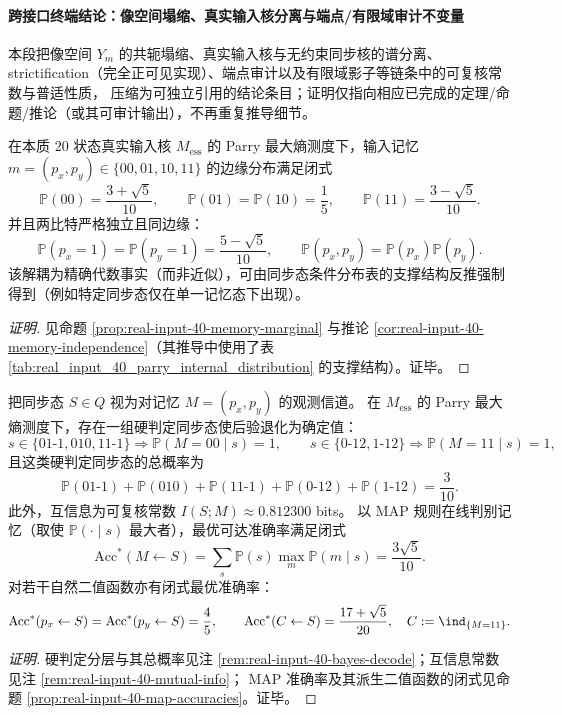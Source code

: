 
\paragraph{跨接口终端结论：像空间塌缩、真实输入核分离与端点/有限域审计不变量}
本段把像空间 \(Y_m\) 的共轭塌缩、真实输入核与无约束同步核的谱分离、strictification（完全正可见实现）、端点审计以及有限域影子等链条中的可复核常数与普适性质，
压缩为可独立引用的结论条目；证明仅指向相应已完成的定理/命题/推论（或其可审计输出），不再重复推导细节。

\begin{conclusion}\label{con:xi-terminal-real-input-parry-memory-decoupling}
在本质 \(20\) 状态真实输入核 \(M_{\mathrm{ess}}\) 的 Parry 最大熵测度下，输入记忆
\(m=(p_x,p_y)\in\{00,01,10,11\}\) 的边缘分布满足闭式
\[
\mathbb{P}(00)=\frac{3+\sqrt5}{10},\qquad
\mathbb{P}(01)=\mathbb{P}(10)=\frac15,\qquad
\mathbb{P}(11)=\frac{3-\sqrt5}{10}.
\]
并且两比特严格独立且同边缘：
\[
\mathbb{P}(p_x=1)=\mathbb{P}(p_y=1)=\frac{5-\sqrt5}{10},
\qquad
\mathbb{P}(p_x,p_y)=\mathbb{P}(p_x)\mathbb{P}(p_y).
\]
该解耦为精确代数事实（而非近似），可由同步态条件分布表的支撑结构反推强制得到（例如特定同步态仅在单一记忆态下出现）。
\end{conclusion}
\begin{proof}[证明]
见命题 \ref{prop:real-input-40-memory-marginal} 与推论 \ref{cor:real-input-40-memory-independence}（其推导中使用了表 \ref{tab:real_input_40_parry_internal_distribution} 的支撑结构）。证毕。
\end{proof}

\begin{conclusion}\label{con:xi-terminal-sync-memory-hard-decision-map-accuracy}
把同步态 \(S\in Q\) 视为对记忆 \(M=(p_x,p_y)\) 的观测信道。
在 \(M_{\mathrm{ess}}\) 的 Parry 最大熵测度下，存在一组硬判定同步态使后验退化为确定值：
\[
s\in\{01\text{-}1,010,11\text{-}1\}\Rightarrow \mathbb{P}(M=00\mid s)=1,
\qquad
s\in\{0\text{-}12,1\text{-}12\}\Rightarrow \mathbb{P}(M=11\mid s)=1,
\]
且这类硬判定同步态的总概率为
\[
\mathbb{P}(01\text{-}1)+\mathbb{P}(010)+\mathbb{P}(11\text{-}1)+\mathbb{P}(0\text{-}12)+\mathbb{P}(1\text{-}12)=\frac{3}{10}.
\]
此外，互信息为可复核常数
\(
I(S;M)\approx 0.812300
\) bits。
以 MAP 规则在线判别记忆（取使 \(\mathbb{P}(\cdot\mid s)\) 最大者），最优可达准确率满足闭式
\[
\mathrm{Acc}^*(M\leftarrow S)=\sum_s \mathbb{P}(s)\max_m \mathbb{P}(m\mid s)=\frac{3\sqrt5}{10}.
\]
对若干自然二值函数亦有闭式最优准确率：
\[
\mathrm{Acc}^*(p_x\leftarrow S)=\mathrm{Acc}^*(p_y\leftarrow S)=\frac45,
\qquad
\mathrm{Acc}^*(C\leftarrow S)=\frac{17+\sqrt5}{20},
\quad
C:=\ind_{\{M=11\}}.
\]
\end{conclusion}
\begin{proof}[证明]
硬判定分层与其总概率见注 \ref{rem:real-input-40-bayes-decode}；互信息常数见注 \ref{rem:real-input-40-mutual-info}；
MAP 准确率及其派生二值函数的闭式见命题 \ref{prop:real-input-40-map-accuracies}。证毕。
\end{proof}


